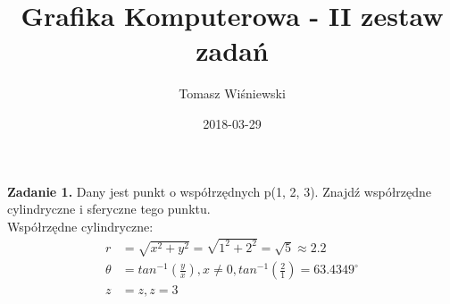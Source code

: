 \documentclass[a4paper]{article}
\title{Grafika Komputerowa - II zestaw zadań}
\date{2018-03-29}
\author{Tomasz Wiśniewski}
\begin{document}
\maketitle

  \newpage
  \noindent\textbf{Zadanie 1.}
  \textnormal{Dany jest punkt o współrzędnych p(1, 2, 3). Znajdź współrzędne cylindryczne i
sferyczne tego punktu.}\\

\noindent\textnormal{Współrzędne cylindryczne:}
\begin{align*}
r &= \sqrt{x^2 + y^2} = \sqrt{1^2 + 2^2} = \sqrt{5} \approx 2.2\\
\theta &= tan^{-1}\left(\frac{y}{x}\right) , x \ne 0 , tan^{-1}\left(\frac{2}{1}\right) = 63.4349^{\circ}\\
z &= z , z = 3
\end{align*}
\end{document}
